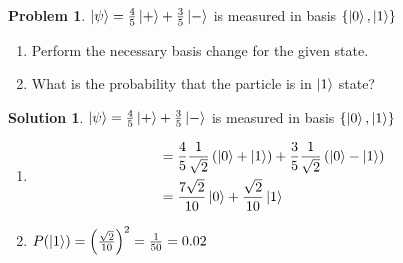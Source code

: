 \documentclass[10pt]{article}
\theoremstyle{definition}
\newtheorem{problem}{Problem}
\newtheorem{soln}{Solution}
\begin{document}
\begin{problem}
$\ket{\psi}=\frac{4}{5}\ket{+}+\frac{3}{5}\ket{-}$ is measured in basis $\left\{\ket{0},\ket{1}\right\}$
\begin{enumerate}[label=(\alph*)]
  \item Perform the necessary basis change for the given state.
  \item What is the probability that the particle is in $\ket{1}$ state?
\end{enumerate}
\end{problem}
\begin{soln}
  $\ket{\psi}=\frac{4}{5}\ket{+}+\frac{3}{5}\ket{-}$ is measured in basis $\left\{\ket{0},\ket{1}\right\}$
  \begin{enumerate}[label=(\alph*)]
    \item \begin{align*}
             & = \frac{4}{5}\frac{1}{\sqrt{2}}\left(\ket{0}+\ket{1}\right)+\frac{3}{5}\frac{1}{\sqrt{2}}\left(\ket{0}-\ket{1}\right) \\
             & = \frac{7\sqrt{2}}{10}\ket{0}+\frac{\sqrt{2}}{10}\ket{1}
          \end{align*}
    \item $P(\ket{1})=\left(\frac{\sqrt{2}}{10}\right)^2=\frac{1}{50}=0.02$
  \end{enumerate}
\end{soln}
\end{document}
